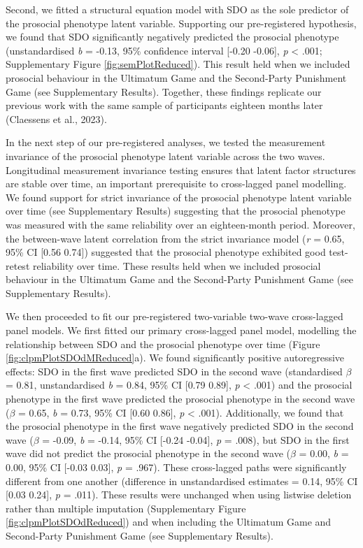 \documentclass[
  man,floatsintext]{apa6}
\begin{document}
Second, we fitted a structural equation model with SDO as the sole predictor of
the prosocial phenotype latent variable. Supporting our pre-registered
hypothesis, we found that SDO significantly negatively predicted the prosocial
phenotype (unstandardised \emph{b} = -0.13, 95\% confidence interval
{[}-0.20 -0.06{]}, \emph{p} \textless{} .001;
Supplementary Figure \ref{fig:semPlotReduced}). This result held when we
included prosocial behaviour in the Ultimatum Game and the Second-Party
Punishment Game (see Supplementary Results). Together, these findings replicate
our previous work with the same sample of participants eighteen months later
(Claessens et al., 2023).

In the next step of our pre-registered analyses, we tested the measurement
invariance of the prosocial phenotype latent variable across the two waves.
Longitudinal measurement invariance testing ensures that latent factor
structures are stable over time, an important prerequisite to cross-lagged
panel modelling. We found support for strict invariance of the prosocial
phenotype latent variable over time (see Supplementary Results) suggesting that
the prosocial phenotype was measured with the same reliability over an
eighteen-month period. Moreover, the between-wave latent correlation from the
strict invariance model (\emph{r} =
0.65, 95\% CI
{[}0.56
0.74{]}) suggested
that the prosocial phenotype exhibited good test-retest reliability over time.
These results held when we included prosocial behaviour in the Ultimatum Game
and the Second-Party Punishment Game (see Supplementary Results).

We then proceeded to fit our pre-registered two-variable two-wave cross-lagged
panel models. We first fitted our primary cross-lagged panel model, modelling
the relationship between SDO and the prosocial phenotype over time (Figure
\ref{fig:clpmPlotSDOdMReduced}a). We found significantly positive autoregressive
effects: SDO in the first wave predicted SDO in the second wave (standardised
\(\beta\) = 0.81,
unstandardised \emph{b} = 0.84, 95\% CI {[}0.79
0.89{]}, \emph{p} \textless{} .001) and the prosocial phenotype
in the first wave predicted the prosocial phenotype in the second wave
(\(\beta\) = 0.65, \emph{b} =
0.73, 95\% CI {[}0.60 0.86{]},
\emph{p} \textless{} .001). Additionally, we found that the prosocial phenotype
in the first wave negatively predicted SDO in the second wave (\(\beta\) =
-0.09, \emph{b} =
-0.14, 95\% CI {[}-0.24 -0.04{]},
\emph{p} = .008), but SDO in the first wave did not predict the
prosocial phenotype in the second wave (\(\beta\)
= 0.00, \emph{b} =
0.00, 95\% CI {[}-0.03 0.03{]},
\emph{p} = .967). These cross-lagged paths were significantly
different from one another (difference in unstandardised estimates =
0.14, 95\% CI {[}0.03 0.24{]},
\emph{p} = .011). These results were unchanged when using listwise
deletion rather than multiple imputation (Supplementary Figure
\ref{fig:clpmPlotSDOdReduced}) and when including the Ultimatum Game and
Second-Party Punishment Game (see Supplementary Results).
\end{document}
